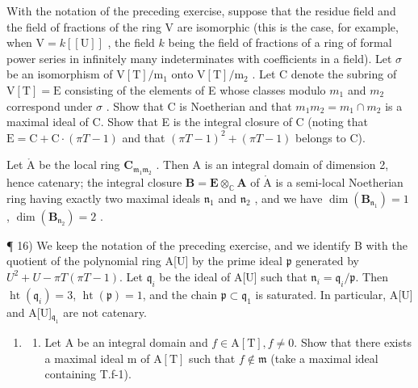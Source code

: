 With the notation of the preceding exercise, suppose that the residue field and the field of fractions of the ring V are isomorphic (this is the case, for example, when \(\mathrm{V} = k[[\mathrm{U}]]\) , the field \(k\) being the field of fractions of a ring of formal power series in infinitely many indeterminates with coefficients in a field). Let \(\sigma\) be an isomorphism of \(\mathrm{V[T] / m_1}\) onto \(\mathrm{V[T] / m_2}\) . Let C denote the subring of \(\mathrm{V[T]} = \mathrm{E}\) consisting of the elements of E whose classes modulo \(m_1\) and \(m_2\) correspond under \(\sigma\) . Show that C is Noetherian and that \(m_1m_2 = m_1 \cap m_2\) is a maximal ideal of C. Show that E is the integral closure of C (noting that \(\mathrm{E} = \mathrm{C} + \mathrm{C}\cdot(\pi T - 1)\) and that \((\pi T - 1)^2 + (\pi T - 1)\) belongs to C).

Let \(\mathring{\mathrm{A}}\) be the local ring \(\mathbf{C}_{\mathfrak{m}_1\mathfrak{m}_2}\) . Then A is an integral domain of dimension 2, hence catenary; the integral closure \(\mathbf{B} = \mathbf{E} \otimes_{\mathbb{C}} \mathbf{A}\) of \(\mathring{\mathrm{A}}\) is a semi-local Noetherian ring having exactly two maximal ideals \(\mathfrak{n}_1\) and \(\mathfrak{n}_2\) , and we have \(\dim(\mathbf{B}_{\mathfrak{n}_1}) = 1\) , \(\dim(\mathbf{B}_{\mathfrak{n}_2}) = 2\) .

¶ 16) We keep the notation of the preceding exercise, and we identify B with the quotient of the polynomial ring A{[}U{]} by the prime ideal \(\mathfrak{p}\) generated by \(U^2 + U - \pi T(\pi T - 1)\). Let \(\mathfrak{q}_i\) be the ideal of A{[}U{]} such that \(\mathfrak{n}_i = \mathfrak{q}_i/\mathfrak{p}\). Then \(\operatorname{ht}(\mathfrak{q}_i) = 3\), \(\operatorname{ht}(\mathfrak{p}) = 1\), and the chain \(\mathfrak{p} \subset \mathfrak{q}_1\) is saturated. In particular, A{[}U{]} and A{[}U{]}\(_{\mathfrak{q}_1}\) are not catenary.

\begin{enumerate}
\def\labelenumi{\arabic{enumi})}
\setcounter{enumi}{16}
\tightlist
\item
  \begin{enumerate}
  \def\labelenumii{\alph{enumii})}
  \tightlist
  \item
    Let A be an integral domain and \(f \in \mathrm{A}[\mathrm{T}], f \neq 0\). Show that there exists a maximal ideal m of \(\mathrm{A}[\mathrm{T}]\) such that \(f \notin \mathfrak{m}\) (take a maximal ideal containing T.f-1).
  \end{enumerate}
\end{enumerate}

